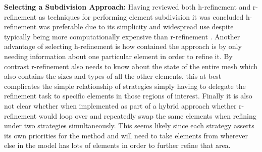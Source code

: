 \noindent
\textbf{Selecting a Subdivision Approach: }  Having reviewed both h-refinement \cite{HandPRefinements} and r-refinement \cite{RRefinement} as techniques for performing element subdivision it was concluded h-refinement was preferable due to its simplicity and widespread use despite typically being more computationally expensive than r-refinement \cite{HandPRefinements, RRefinement}. Another advantage of selecting h-refinement is how contained the approach is by only needing information about one particular element in order to refine it. By contrast r-refinement also needs to know about the state of the entire mesh which also contains the sizes and types of all the other elements, this at best complicates the simple relationship of strategies simply having to delegate the refinement task to specific elements in those regions of interest. Finally it is also not clear whether when implemented as part of a hybrid approach whether r-refinement would loop over and repeatedly swap the same elements when refining under two strategies simultaneously. This seems likely since each strategy asserts its own priorities for the method and will need to take elements from wherever else in the model has lots of elements in order to further refine that area. \\ 


